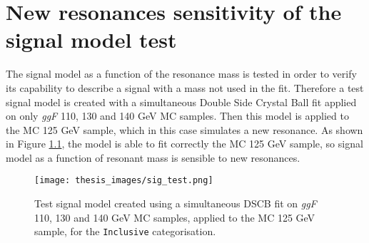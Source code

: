 \documentclass[a4paper, oneside, 11pt, openright]{book}
\begin{document}
	\chapter{New resonances sensitivity of the signal model test}\label{appex:test}
		The signal model as a function of the resonance mass is tested in order to verify its capability to describe a signal with a mass not used in the fit. Therefore a test signal model is created with a simultaneous Double Side Crystal Ball fit applied on only \textit{ggF} 110, 130 and 140 GeV MC samples. Then this model is applied to the MC 125 GeV sample, which in this case simulates a new resonance. As shown in Figure \ref{fig:sig_test}, the model is able to fit correctly the MC 125 GeV sample, so signal model as a function of resonant mass is sensible to new resonances.
		\vspace{.5cm}
		\begin{figure}[h!]
			\centering
			\texttt{[image: thesis\_images/sig\_test.png]}
			\caption{Test signal model created using a simultaneous DSCB fit on \textit{ggF} 110, 130 and 140 GeV MC samples, applied to the MC 125 GeV sample, for the \texttt{Inclusive} categorisation.}
			\label{fig:sig_test}
		\end{figure}
		
\end{document}
